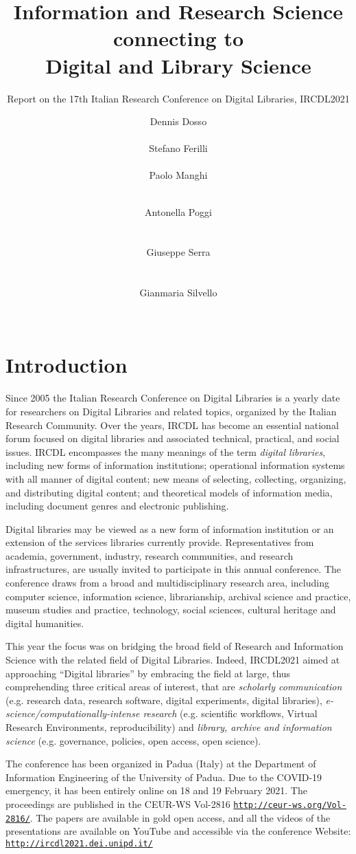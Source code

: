 \documentclass{sig-alternate-10pt}
\title{Information and Research Science connecting to \\ Digital and Library Science}
\subtitle{Report on the 17th Italian Research Conference on Digital Libraries, IRCDL2021}
\author{
\alignauthor
Dennis Dosso\\
\affaddr{University of Padova}\\
\affaddr{Padua, Italy}
\email{dennis.dosso@unipd.it}
\alignauthor
Stefano Ferilli\\
\affaddr{University of Bari}\\
\affaddr{Bari, Italy}
\email{stefano.ferilli@uniba.it}
\alignauthor
Paolo Manghi\\
\affaddr{{ISTI - Consiglio Nazionale delle Ricerche}}\\
\affaddr{Pisa, Italy}
\email{manghi@isti.cnr.it}
\and
Antonella Poggi\\
\affaddr{``La Sapienza'', University of Rome}\\
\affaddr{Rome, Italy}\\
\email{antonella.poggi@uniroma1.it}
\alignauthor
Giuseppe Serra\\
\affaddr{University of Udine}\\
\affaddr{Udine, Italy}\\
\email{giuseppe.serra@uniud.it}
\alignauthor
Gianmaria Silvello\\
\affaddr{University of Padova}\\
\affaddr{Padua, Italy}
\email{gianmaria.silvello@unipd.it}}
\begin{document}
\maketitle
\pagestyle{empty}

\section{Introduction}
Since 2005 the Italian Research Conference on Digital Libraries is a yearly date for researchers on Digital Libraries and related topics, organized by the Italian Research Community. Over the years, IRCDL has become an essential national forum focused on digital libraries and associated technical, practical, and social issues. IRCDL encompasses the many meanings of the term \emph{digital libraries}, including new forms of information institutions; operational information systems with all manner of digital content; new means of selecting, collecting, organizing, and distributing digital content; and theoretical models of information media, including document genres and electronic publishing. 

Digital libraries may be viewed as a new form of information institution or an extension of the services libraries currently provide. Representatives from academia, government, industry, research communities, and research infrastructures, are usually invited to participate in this annual conference. The conference draws from a broad and multidisciplinary research area, including computer science, information science, librarianship, archival science and practice, museum studies and practice, technology, social sciences, cultural heritage and digital humanities. 

This year the focus was on bridging the broad field of Research and Information Science with the related field of Digital Libraries. Indeed, IRCDL2021 aimed at approaching ``Digital libraries'' by embracing the field at large, thus comprehending three critical areas of interest, that are \emph{scholarly communication} (e.g. research data, research software, digital experiments, digital libraries), \emph{e-science/com\-put\-ationally-intense research} (e.g. scientific workflows, Virtual Research Environments, reproducibility) and \emph{library, archive and information science} (e.g. governance, policies, open access, open science).

The conference has been organized in Padua (Italy) at the Department of Information Engineering of the University of Padua. Due to the COVID-19 emergency, it has been entirely online on 18 and 19 February 2021. The proceedings are published in the CEUR-WS  Vol-2816 \texttt{\url{http://ceur-ws.org/Vol-2816/}}. The papers are available in gold open access, and all the videos of the presentations are available on YouTube and accessible via the conference Website: \texttt{\url{http://ircdl2021.dei.unipd.it/}}
\end{document}
